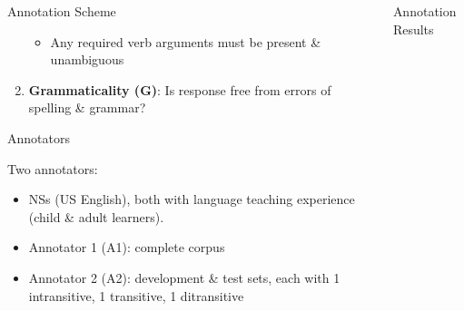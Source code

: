 \documentclass[final,t]{beamer}
\begin{document}
\begin{frame}{}
\begin{columns}[t]
\begin{column}{.33\linewidth}
\begin{block}{Annotation Scheme}
\begin{center}
\begin{minipage}{.85\textwidth}
\begin{enumerate}
\begin{itemize}
\item Any required verb arguments must be present \& unambiguous
\end{itemize}
\vspace{.5em}
\item \textbf{Grammaticality (G)}: Is response free from errors of spelling \& grammar?  

\end{enumerate}



\end{minipage}
\end{center}
\vspace{-.5em}
\end{block}

\begin{block}{Annotators}
\begin{center}
\begin{minipage}{.85\textwidth}
Two annotators:
\begin{itemize}
	\item NSs (US English), both with language teaching experience (child \& adult learners).
	\item Annotator 1 (A1): complete corpus
        \item Annotator 2 (A2): development \& test sets, each with 1 intransitive, 1 transitive, 1 ditransitive
\end{itemize}
\end{minipage}
\end{center}
\vspace{-.5em}
\end{block}


\end{column}

\begin{column}{.33\linewidth}
\begin{block}{Annotation Results}
\begin{center}
\begin{minipage}{.85\textwidth}


\end{minipage}
\end{center}
\end{block}
\end{column}
\end{columns}
\end{frame}
\end{document}
